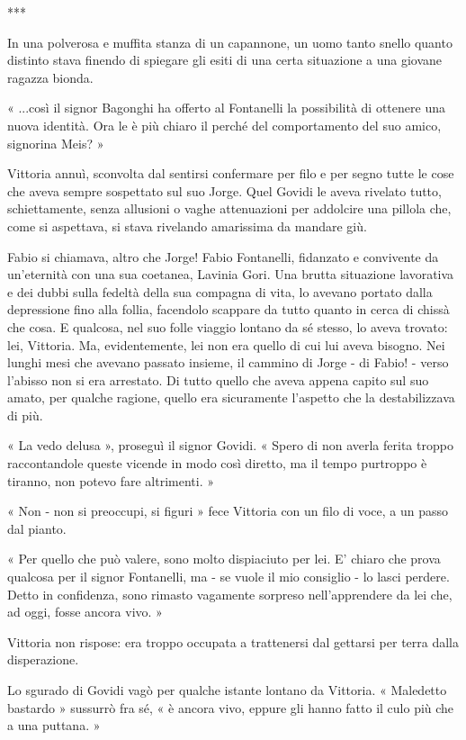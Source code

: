 ***

In una polverosa e muffita stanza di un capannone, un uomo tanto snello quanto distinto stava finendo di spiegare gli esiti di una certa situazione a una giovane ragazza bionda.

« ...così il signor Bagonghi ha offerto al Fontanelli la possibilità di ottenere una nuova identità. Ora le è più chiaro il perché del comportamento del suo amico, signorina Meis? »

Vittoria annuì, sconvolta dal sentirsi confermare per filo e per segno tutte le cose che aveva sempre sospettato sul suo Jorge. Quel Govidi le aveva rivelato tutto, schiettamente, senza allusioni o vaghe attenuazioni per addolcire una pillola che, come si aspettava, si stava rivelando amarissima da mandare giù.

Fabio si chiamava, altro che Jorge! Fabio Fontanelli, fidanzato e convivente da un'eternità con una sua coetanea, Lavinia Gori. Una brutta situazione lavorativa e dei dubbi sulla fedeltà della sua compagna di vita, lo avevano portato dalla depressione fino alla follia, facendolo scappare da tutto quanto in cerca di chissà che cosa. E qualcosa, nel suo folle viaggio lontano da sé stesso, lo aveva trovato: lei, Vittoria. Ma, evidentemente, lei non era quello di cui lui aveva bisogno. Nei lunghi mesi che avevano passato insieme, il cammino di Jorge - di Fabio! - verso l'abisso non si era arrestato. Di tutto quello che aveva appena capito sul suo amato, per qualche ragione, quello era sicuramente l'aspetto che la destabilizzava di più.

« La vedo delusa », proseguì il signor Govidi. « Spero di non averla ferita troppo raccontandole queste vicende in modo così diretto, ma il tempo purtroppo è tiranno, non potevo fare altrimenti. »

« Non - non si preoccupi, si figuri » fece Vittoria con un filo di voce, a un passo dal pianto.

« Per quello che può valere, sono molto dispiaciuto per lei. E' chiaro che prova qualcosa per il signor Fontanelli, ma - se vuole il mio consiglio - lo lasci perdere. Detto in confidenza, sono rimasto vagamente sorpreso nell'apprendere da lei che, ad oggi, fosse ancora vivo. »

Vittoria non rispose: era troppo occupata a trattenersi dal gettarsi per terra dalla disperazione.

Lo sgurado di Govidi vagò per qualche istante lontano da Vittoria. « Maledetto bastardo » sussurrò fra sé, « è ancora vivo, eppure gli hanno fatto il culo più che a una puttana. »

